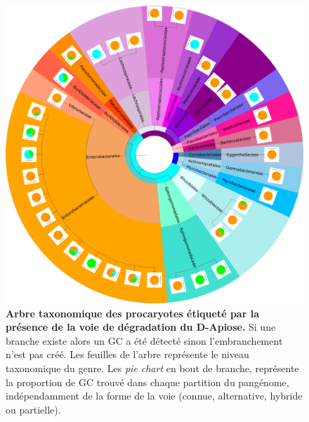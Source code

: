 \begin{figure}[htbp] 
    \centering
    \includegraphics[width=\textwidth]{images/phylogenetic_tree_with_pies.png}
    \caption[Arbre taxonomique des procaryotes étiqueté par la présence de la voie de dégradation du D-Apiose]{\textbf{Arbre taxonomique des procaryotes étiqueté par la présence de la voie de dégradation du D-Apiose.} Si une branche existe alors un GC a été détecté sinon l'embranchement n'est pas créé. Les feuilles de l'arbre représente le niveau taxonomique du genre. Les \textit{pie chart} en bout de branche, représente la proportion de GC trouvé dans chaque partition du pangénome, indépendamment de la forme de la voie (connue, alternative, hybride ou partielle).} 
    \label{fig:PhyloTreeApiose}
\end{figure}

